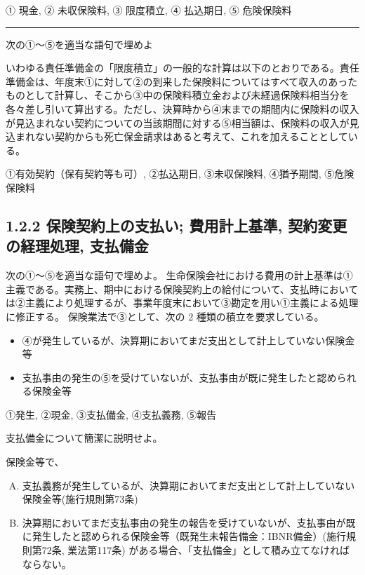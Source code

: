 \documentclass[report,gutter=10mm,fore-edge=10mm,uplatex,dvipdfmx]{jlreq}
\begin{document}

① 現金, ② 未収保険料, ③ 限度積立, ④ 払込期日, ⑤ 危険保険料

\begin{center}\rule{0.5\linewidth}{0.5pt}\end{center}


次の①～⑤を適当な語句で埋めよ

いわゆる責任準備金の「限度積立」の一般的な計算は以下のとおりである。責任準備金は、年度末①に対して②の到来した保険料についてはすべて収入のあったものとして計算し、そこから③中の保険料積立金および未経過保険料相当分を各々差し引いて算出する。ただし、決算時から④末までの期間内に保険料の収入が見込まれない契約についての当該期間に対する⑤相当額は、保険料の収入が見込まれない契約からも死亡保金請求はあると考えて、これを加えることとしている。



①有効契約（保有契約等も可）, ②払込期日, ③未収保険料, ④猶予期間,
⑤危険保険料


\subsection{1.2.2 保険契約上の支払い; 費用計上基準, 契約変更の経理処理, 支払備金}


次の①～⑤を適当な語句で埋めよ。
生命保険会社における費用の計上基準は①主義である。実務上、期中における保険契約上の給付について、支払時においては②主義により処理するが、事業年度末において③勘定を用い①主義による処理に修正する。
保険業法で③として、次の 2 種類の積立を要求している。

\begin{itemize}
\tightlist
\item
  ④が発生しているが、決算期においてまだ支出として計上していない保険金等
\item
  支払事由の発生の⑤を受けていないが、支払事由が既に発生したと認められる保険金等
\end{itemize}



①発生, ②現金, ③支払備金, ④支払義務, ⑤報告


支払備金について簡潔に説明せよ。


保険金等で、
\begin{enumerate} [A.]
 \item 支払義務が発生しているが、決算期においてまだ支出として計上していない保険金等(施行規則第73条)
\item 決算期においてまだ支払事由の発生の報告を受けていないが、支払事由が既に発生したと認められる保険金等（既発生未報告備金：IBNR備金）(施行規則第72条,
 業法第117条) がある場合、「支払備金」として積み立てなければならない。
\end{enumerate}
\end{document}
